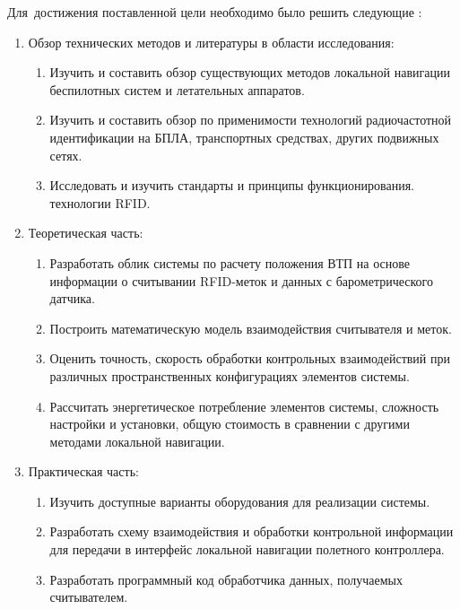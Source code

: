 Для~достижения поставленной цели необходимо было решить следующие {\tasks}:
\begin{enumerate}[beginpenalty=10000] %
    \item Обзор технических методов и литературы в области исследования:
    \begin{enumerate}
        \item Изучить и составить обзор существующих методов локальной навигации 
              беспилотных систем и летательных аппаратов.
        \item Изучить и составить обзор по применимости технологий радиочастотной
              идентификации на БПЛА, транспортных средствах, других подвижных сетях.
        \item Исследовать и изучить стандарты и принципы функционирования.
              технологии RFID.
    \end{enumerate}
    \item Теоретическая часть:
    \begin{enumerate}
        \item Разработать облик системы по расчету положения ВТП на основе 
              информации о считывании RFID-меток и данных с барометрического датчика.
        \item Построить математическую модель взаимодействия считывателя и меток.
        \item Оценить точность, скорость обработки контрольных взаимодействий 
              при различных пространственных конфигурациях элементов системы.
        \item Рассчитать энергетическое потребление элементов системы, сложность 
              настройки и установки, общую стоимость в сравнении с другими 
              методами локальной навигации.
    \end{enumerate}
    \item Практическая часть:
    \begin{enumerate}
        \item Изучить доступные варианты оборудования для реализации системы.
        \item Разработать схему взаимодействия и обработки контрольной информации
              для передачи в интерфейс локальной навигации полетного контроллера.
        \item Разработать программный код обработчика данных, получаемых считывателем.
    \end{enumerate}    
\end{enumerate}


